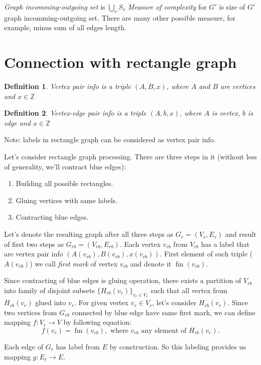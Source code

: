 \documentclass[12pt,a4paper,oneside]{article}
\newtheorem{definition}{Definition}
\begin{document}
\emph{Graph incomming-outgoing set} is $\bigcup_v S_v$
\emph{Measure of complexity} for $G'$ is size of $G'$ graph incomming-outgoing set.
There are many other possible measure, for example, minus sum of all edges length.

\section{Connection with rectangle graph}

\begin{definition}
  \emph{Vertex pair info} is a triple $(A, B, x)$, where $A$ and $B$ are vertices and $x \in \mathbb{Z}$ 
\end{definition}
\begin{definition}
  \emph{Vertex-edge pair info} is a triple $(A, b, x)$, where $A$ is vertex, $b$ is edge and $x \in \mathbb{Z}$ 
\end{definition}
Note: labels in rectangle graph can be considered as vertex pair info.

Let's consider rectangle graph processing. 
There are three steps in it (without less of generality, we'll contract blue edges):
\begin{enumerate}
\item Building all possible rectangles.
\item Gluing vertices with same labels.
\item Contracting blue edges.
\end{enumerate}
Let's denote the resulting graph after all three steps as $G_r = (V_r,E_r)$ and result of first two steps as $G_{rb} = (V_{rb}, E_{rb})$. Each vertex $v_{rb}$ from $V_{rb}$ has a label that are vertex pair info $(A(v_{rb}), B(v_{rb}), x(v_{rb}))$. First element of such triple ($A(v_{rb})$) we call \emph{first mark} of vertex $v_{rb}$ and denote it $\mathop{fm}(v_{rb})$. 

Since contracting of blue edges is gluing operation, there exists a partition of $V_{rb}$ into family of disjoint subsets $\{H_{rb}(v_r)\}_{v_r\in V_r}$ such that all vertex from $H_{rb}(v_r)$ glued into $v_r$. 
For given vertex $v_r \in V_r$, let's consider $H_{rb}(v_r)$. Since two vertices from $G_{rb}$ connected by blue edge have same first mark, we can define mapping $f: V_r\rightarrow V$ by following equation:
$$f(v_r)=\mathop{fm}(v_{rb}), \text{ where }v_{rb}\text{ any element of } H_{rb}(v_r).$$

Each edge of $G_{r}$ has label from $E$ by construction. So this labeling provides us mapping $g:E_{r}\rightarrow E$. 
\end{document}
